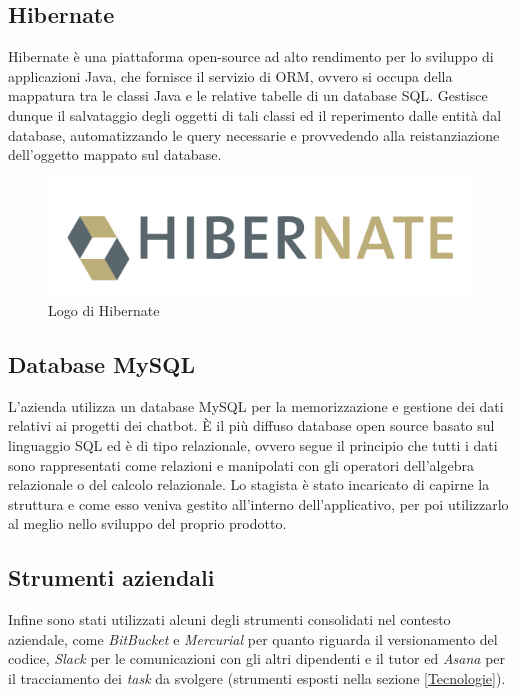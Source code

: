 \subsection{Hibernate}
Hibernate è una piattaforma open-source ad alto rendimento per lo sviluppo di applicazioni Java, che fornisce il servizio di \gls{ORM}, ovvero si occupa della mappatura tra le classi Java e le relative tabelle di un database \gls{SQL}.
Gestisce dunque il salvataggio degli oggetti di tali classi ed il reperimento dalle entità dal database, automatizzando le query necessarie e provvedendo alla reistanziazione dell’oggetto mappato sul database.
\begin{figure}[h]
	\centering
	\includegraphics[scale=0.35]{../Immagini/Hibernate.png}
	\caption{Logo di Hibernate}
\end{figure}

\subsection{Database MySQL} 
L'azienda \azienda{} utilizza un database MySQL per la memorizzazione e gestione dei dati relativi ai progetti dei \gls{chatbot}. È il più diffuso database \Gls{open source} basato sul linguaggio \gls{SQL} ed è di tipo relazionale, ovvero segue il principio che tutti i dati sono rappresentati come relazioni e manipolati con gli operatori dell’algebra relazionale o del calcolo relazionale.
Lo stagista è stato incaricato di capirne la struttura e come esso veniva gestito all'interno dell'applicativo, per poi utilizzarlo al meglio nello sviluppo del proprio prodotto.\\

\subsection{Strumenti aziendali}
Infine sono stati utilizzati alcuni degli strumenti consolidati nel contesto aziendale, come \emph{BitBucket} e \emph{Mercurial} per quanto riguarda il versionamento del codice, \emph{Slack} per le comunicazioni con gli altri dipendenti e il tutor ed \emph{Asana} per il tracciamento dei \emph{task} da svolgere (strumenti esposti nella sezione \ref{Tecnologie}).



